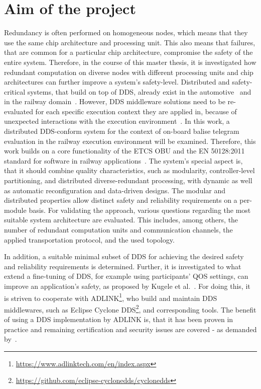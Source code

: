 \documentclass[a4paper, 12pt]{scrartcl}
\begin{document}
\section*{Aim of the project}
Redundancy is often performed on homogeneous nodes, which means that they use the same chip architecture and processing unit.
This also means that failures, that are common for a particular chip architecture, compromise the safety of the entire system.
Therefore, in the course of this master thesis, it is investigated how redundant computation on diverse nodes with different processing units and chip architectures can further improve a system's safety-level.
Distributed and safety-critical systems, that build on top of \gls*{DDS}, already exist in the automotive~\cite{DistributedSafety2020} and in the railway domain~\cite{DDSInURail}.
However, \gls*{DDS} middleware solutions need to be re-evaluated for each specific execution context they are applied in, because of unexpected interactions with the execution environment~\cite{CotroneoDDSFailureAnalysis}.
In this work, a distributed \gls*{DDS}-conform system for the context of on-board balise telegram evaluation in the railway execution environment will be examined.
Therefore, this work builds on a core functionality of the \gls*{ETCS OBU} and the EN 50128:2011 standard for software in railway applications~\cite{BoulangerStandards}.
The system's special aspect is, that it should combine quality characteristics, such as modularity, control\-ler-level partitioning, and distributed diverse-redundant processing, with dynamic as well as automatic reconfiguration and data-driven designs.
The modular and distributed properties allow distinct safety and reliability requirements on a per-module basis.
For validating the approach, various questions regarding the most suitable system architecture are evaluated.
This includes, among others, the number of redundant computation units and communication channels, the applied transportation protocol, and the used topology.

In addition, a suitable minimal subset of \gls*{DDS} for achieving the desired safety and reliability requirements is determined.
Further, it is investigated to what extend a fine-tuning of \gls*{DDS}, for example using participants' \gls*{QOS} settings, can improve an application's safety, as proposed by Kugele et al.~\cite{KugeleDataCentricForAuto}.
For doing this, it is striven to cooperate with ADLINK\footnote{\url{https://www.adlinktech.com/en/index.aspx}}, who build and maintain \gls*{DDS} middlewares, such as Eclipse Cyclone DDS\footnote{\url{https://github.com/eclipse-cyclonedds/cyclonedds}}, and corresponding tools.
The benefit of using a \gls*{DDS} implementation by ADLINK is, that it has been proven in practice and remaining certification and security issues are covered - as demanded by~\cite{KugeleDataCentricForAuto}.
\end{document}
